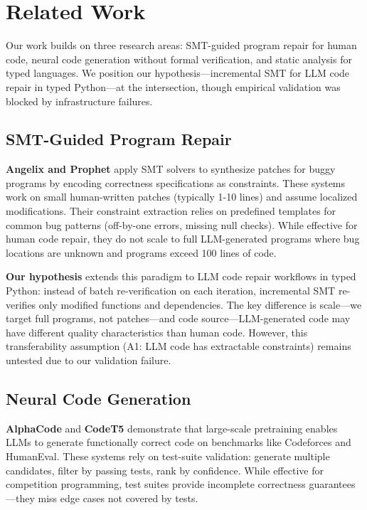 \section{Related Work}

Our work builds on three research areas: SMT-guided program repair for human code, neural code generation without formal verification, and static analysis for typed languages. We position our hypothesis---incremental SMT for LLM code repair in typed Python---at the intersection, though empirical validation was blocked by infrastructure failures.

\subsection{SMT-Guided Program Repair}

\textbf{Angelix and Prophet} apply SMT solvers to synthesize patches for buggy programs by encoding correctness specifications as constraints. These systems work on small human-written patches (typically 1-10 lines) and assume localized modifications. Their constraint extraction relies on predefined templates for common bug patterns (off-by-one errors, missing null checks). While effective for human code repair, they do not scale to full LLM-generated programs where bug locations are unknown and programs exceed 100 lines of code.

\textbf{Our hypothesis} extends this paradigm to LLM code repair workflows in typed Python: instead of batch re-verification on each iteration, incremental SMT re-verifies only modified functions and dependencies. The key difference is scale---we target full programs, not patches---and code source---LLM-generated code may have different quality characteristics than human code. However, this transferability assumption (A1: LLM code has extractable constraints) remains untested due to our validation failure.

\subsection{Neural Code Generation}

\textbf{AlphaCode} and \textbf{CodeT5} demonstrate that large-scale pretraining enables LLMs to generate functionally correct code on benchmarks like Codeforces and HumanEval. These systems rely on test-suite validation: generate multiple candidates, filter by passing tests, rank by confidence. While effective for competition programming, test suites provide incomplete correctness guarantees---they miss edge cases not covered by tests.

